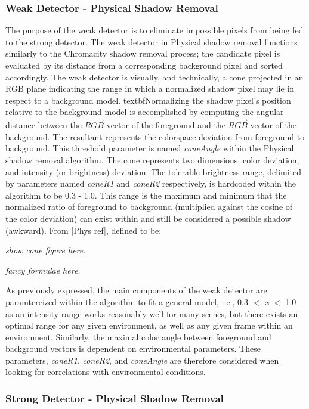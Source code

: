 \documentclass[12pt]{report}
\begin{document}
\subsubsection{Weak Detector - Physical Shadow Removal}

The purpose of the weak detector is to eliminate impossible pixels from being fed to the strong detector. The weak detector in Physical shadow removal functions similarly to the Chromacity shadow removal process; the candidate pixel is evaluated by its distance from a corresponding background pixel and sorted accordingly. The weak detector is visually, and technically, a cone projected in an RGB plane indicating the range in which a normalized shadow pixel may lie in respect to a background model. textbf{Normalizing the shadow pixel's position relative to the background model} is accomplished by computing the angular distance between the $\vec{RGB}$ vector of the foreground and the $\vec{RGB}$ vector of the background. The resultant represents the colorspace deviation from foreground to background. This threshold parameter is named \textit{coneAngle} within the Physical shadow removal algorithm. The cone represents two dimensions: color deviation, and intensity (or brightness) deviation. The tolerable brightness range, delimited by parameters named \textit{coneR1} and \textit{coneR2} respectively, is hardcoded within the algorithm to be 0.3 - 1.0. This range is the maximum and minimum that the normalized ratio of foreground to background (multiplied against the cosine of the color deviation) can exist within and still be considered a possible shadow (awkward). From [Phys ref], defined to be:

\textit{show cone figure here.}

\textit{fancy formulae here.}

As previously expressed, the main components of the weak detector are paramtereized within the algorithm to fit a general model, i.e., 0.3 $<$ \textit{x} $<$ 1.0 as an intensity range works reasonably well for many scenes, but there exists an optimal range for any given environment, as well as any given frame within an environment. Similarly, the maximal color angle between foreground and background vectors is dependent on environmental parameters. These parameters, \textit{coneR1}, \textit{coneR2}, and \textit{coneAngle} are therefore considered when looking for correlations with environmental conditions.

\subsubsection{Strong Detector - Physical Shadow Removal}
\end{document}
